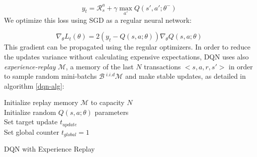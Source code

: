 \documentclass[10pt,a4paper,draft]{article}
\begin{document}
\begin{equation}
y_t = \mathcal{R}_s^a + \gamma\max_{a'}Q(s',a';\theta^-)
\label{dqn_target}
\end{equation}
We optimize this loss using SGD as a regular neural network:

\begin{equation}
\nabla_{\theta} L_t(\theta) = 2(y_t - Q(s,a;\theta))\nabla_{\theta}Q(s,a;\theta)
\end{equation}
This gradient can be propagated using the regular optimizers. In order to reduce the updates variance without calculating expensive expectations, DQN uses also \textit{experience-replay} $\mathcal{M}$, a memory of the last $N$ transactions $<s,a,r,s'>$ in order to sample random mini-batchs $\mathcal{B} ~^{i.i.d} \mathcal{M}$ and make stable updates, as detailed in algorithm \ref{dqn-alg}:

\begin{algorithm}[H]
	\SetAlgoLined
	\DontPrintSemicolon
	\KwResult{$\theta$}
 	Initialize replay memory $\mathcal{M}$ to capacity $N$ \\
	Initialize random $Q(s,a;\theta)$ parameters \\
	Set target update $t_{update}$ \\ 
	Set global counter $t_{global} = 1$ \\
	\caption{DQN with Experience Replay}
 	\label{dqn-alg}
\end{algorithm}
\end{document}
